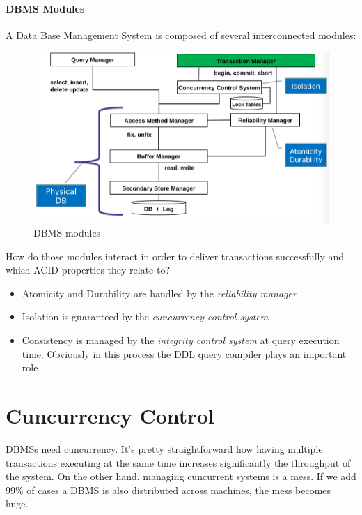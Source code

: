 \documentclass{article}
\begin{document}
			\paragraph{DBMS Modules}
				A Data Base Management System is composed of several interconnected modules:
				\begin{figure}[H]
					\centering
					\includegraphics[width = \textwidth]{./images/DBMSModules.png}
					\caption{DBMS modules}
				\end{figure}
				How do those modules interact in order to deliver transactions successfully and which ACID properties they relate to?
				\begin{itemize}
					\item Atomicity and Durability are handled by the \textit{reliability manager}
					\item Isolation is guaranteed by the \textit{cuncurrency control system}
					\item Consistency is managed by the \textit{integrity control system} at query execution time. Obviously in this process the DDL query compiler plays an important role
				\end{itemize}

		\section{Cuncurrency Control}
			DBMSs need cuncurrency. It's pretty straightforward how having multiple transactions executing at the same time increases significantly the throughput of the system. On the other hand, managing cuncurrent systems is a mess. If we add 99\% of cases a DBMS is also distributed across machines, the mess becomes huge. 
\end{document}
